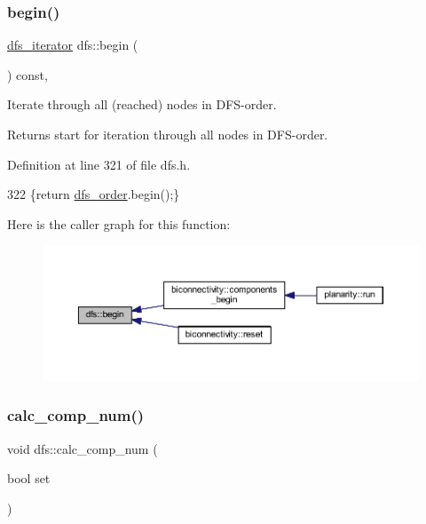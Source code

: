 \subsubsection{\texorpdfstring{begin()}{begin()}}
{\footnotesize\ttfamily \mbox{\hyperlink{classdfs_a15fe023a5a1f7ddda00f3d87110d9a32}{dfs\+\_\+iterator}} dfs\+::begin (\begin{DoxyParamCaption}{ }\end{DoxyParamCaption}) const\hspace{0.3cm}{\ttfamily [inline]}, {\ttfamily [inherited]}}



Iterate through all (reached) nodes in D\+F\+S-\/order. 

\begin{DoxyReturn}{Returns}
start for iteration through all nodes in D\+F\+S-\/order. 
\end{DoxyReturn}


Definition at line 321 of file dfs.\+h.


\begin{DoxyCode}
322     \{\textcolor{keywordflow}{return} \mbox{\hyperlink{classdfs_af70a73ace68afd91ef944f984c9f28d5}{dfs\_order}}.begin();\}
\end{DoxyCode}
Here is the caller graph for this function\+:
\nopagebreak
\begin{figure}[H]
\begin{center}
\leavevmode
\includegraphics[width=350pt]{classdfs_ab06650dd8cbd5e76b0c73b71458ec5ec_icgraph}
\end{center}
\end{figure}
\mbox{\label{classdfs_a70862ea715c52eb95fb704afd3a6e676}} 
\subsubsection{\texorpdfstring{calc\+\_\+comp\+\_\+num()}{calc\_comp\_num()}\hspace{0.1cm}{\footnotesize\ttfamily [1/2]}}
{\footnotesize\ttfamily void dfs\+::calc\+\_\+comp\+\_\+num (\begin{DoxyParamCaption}\item[{bool}]{set }\end{DoxyParamCaption})\hspace{0.3cm}{\ttfamily [inherited]}}



